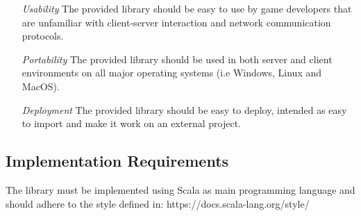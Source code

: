\begin{itemize}
  \item[\emph{Usability}] The provided library should be easy to use by game developers that are unfamiliar with client-server interaction and network communication protocols.
  \item[\em{Portability}] The provided library should be used in both server and client environments on all major operating systems (i.e Windows, Linux and MacOS).
  \item[\em{Deployment}] The provided library should be easy to deploy, intended as easy to import and make it work on an external project. 
\end{itemize}

\subsection{Implementation Requirements}
The library must be implemented using Scala as main programming language and should adhere to the style defined in: https://docs.scala-lang.org/style/
  
 
 

 
